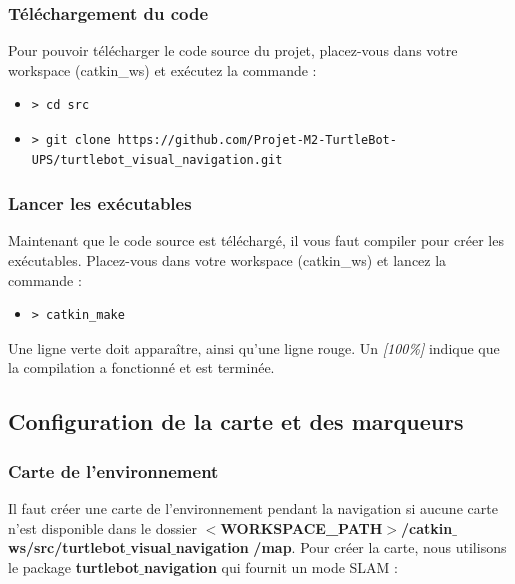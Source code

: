 \documentclass[10pt,a4paper]{article}
\begin{document}
\subsubsection{Téléchargement du code}

Pour pouvoir télécharger le code source du projet, placez-vous dans votre workspace (catkin\_ws) et exécutez la commande :

\begin{itemize}
\item[]  \begin{verbatim}> cd src \end{verbatim}
\item[]  \begin{verbatim}> git clone https://github.com/Projet-M2-TurtleBot-UPS/turtlebot_visual_navigation.git \end{verbatim}
\end{itemize}

\subsubsection{Lancer les exécutables}

Maintenant que le code source est téléchargé, il vous faut compiler pour créer les exécutables. Placez-vous dans votre workspace (catkin\_ws) et lancez la commande :

\begin{itemize}
\item[]  \begin{verbatim}> catkin_make \end{verbatim}
\end{itemize}

Une ligne verte doit apparaître, ainsi qu'une ligne rouge.
Un \upshape \emph{[100\%]} indique que la compilation a fonctionné et est terminée. 

\subsection{Configuration de la carte et des marqueurs}
\label{sec:mapAndMarkersConfig}

\subsubsection{Carte de l'environnement}

Il faut créer une carte de l'environnement pendant la navigation si aucune carte n'est disponible dans le dossier \textbf{$<$WORKSPACE\_PATH$>$/catkin$\_$ws/src/turtlebot$\_$visual$\_$navigation} \textbf{/map}. Pour créer la carte, nous utilisons le package \textbf{turtlebot$\_$navigation} qui fournit un mode SLAM :
\end{document}

